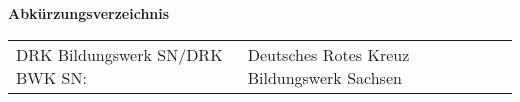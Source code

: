 \textbf{Abkürzungsverzeichnis}\\[1cm]

\begin{tabular}{lll}
DRK Bildungswerk SN/DRK BWK SN: & Deutsches Rotes Kreuz Bildungswerk Sachsen \\[0,5cm]
\end{tabular}